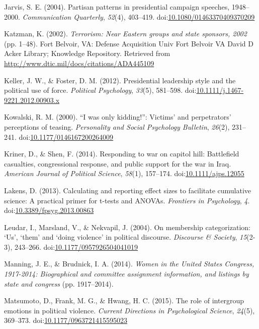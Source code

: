 \documentclass[english,man]{apa6}
\theoremstyle{definition}
\theoremstyle{definition}
\theoremstyle{definition}
\theoremstyle{remark}
\begin{document}
\hypertarget{ref-Jarvis2004}{}
Jarvis, S. E. (2004). Partisan patterns in presidential campaign
speeches, 1948--2000. \emph{Communication Quarterly}, \emph{52}(4),
403--419.
doi:\href{https://doi.org/10.1080/01463370409370209}{10.1080/01463370409370209}

\hypertarget{ref-Katzman2002}{}
Katzman, K. (2002). \emph{Terrorism: Near Eastern groups and state
sponsors, 2002} (pp. 1--48). Fort Belvoir, VA: Defense Acquisition Univ
Fort Belvoir VA David D Acker Library; Knowledge Repository. Retrieved
from \url{http://www.dtic.mil/docs/citations/ADA445109}

\hypertarget{ref-Keller2012}{}
Keller, J. W., \& Foster, D. M. (2012). Presidential leadership style
and the political use of force. \emph{Political Psychology},
\emph{33}(5), 581--598.
doi:\href{https://doi.org/10.1111/j.1467-9221.2012.00903.x}{10.1111/j.1467-9221.2012.00903.x}

\hypertarget{ref-Kowalski2000}{}
Kowalski, R. M. (2000). ``I was only kidding!'': Victims' and
perpetrators' perceptions of teasing. \emph{Personality and Social
Psychology Bulletin}, \emph{26}(2), 231--241.
doi:\href{https://doi.org/10.1177/0146167200264009}{10.1177/0146167200264009}

\hypertarget{ref-Kriner2014}{}
Kriner, D., \& Shen, F. (2014). Responding to war on capitol hill:
Battlefield casualties, congressional response, and public support for
the war in Iraq. \emph{American Journal of Political Science},
\emph{58}(1), 157--174.
doi:\href{https://doi.org/10.1111/ajps.12055}{10.1111/ajps.12055}

\hypertarget{ref-Lakens2013}{}
Lakens, D. (2013). Calculating and reporting effect sizes to facilitate
cumulative science: A practical primer for t-tests and ANOVAs.
\emph{Frontiers in Psychology}, \emph{4}.
doi:\href{https://doi.org/10.3389/fpsyg.2013.00863}{10.3389/fpsyg.2013.00863}

\hypertarget{ref-Leudar2004}{}
Leudar, I., Marsland, V., \& Nekvapil, J. (2004). On membership
categorization: `Us', `them' and `doing violence' in political
discourse. \emph{Discourse \& Society}, \emph{15}(2-3), 243--266.
doi:\href{https://doi.org/10.1177/0957926504041019}{10.1177/0957926504041019}

\hypertarget{ref-Manning2014}{}
Manning, J. E., \& Brudnick, I. A. (2014). \emph{Women in the United
States Congress, 1917-2014: Biographical and committee assignment
information, and listings by state and congress} (pp. 1917--2014).

\hypertarget{ref-Matsumoto2015}{}
Matsumoto, D., Frank, M. G., \& Hwang, H. C. (2015). The role of
intergroup emotions in political violence. \emph{Current Directions in
Psychological Science}, \emph{24}(5), 369--373.
doi:\href{https://doi.org/10.1177/0963721415595023}{10.1177/0963721415595023}
\end{document}
